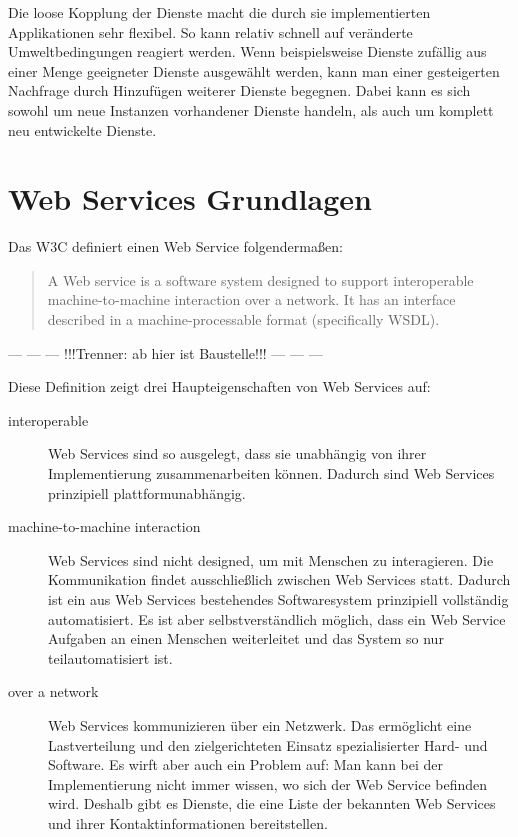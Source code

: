 \documentclass[runningheads]{llncs}
\newcommand{\germanquote}[1]{\glqq{}#1\grqq{}}
\begin{document}
    Die loose Kopplung der Dienste macht die durch sie implementierten Applikationen sehr flexibel. So kann relativ schnell auf veränderte Umweltbedingungen reagiert werden. Wenn beispielsweise Dienste zufällig aus einer Menge geeigneter Dienste ausgewählt werden, kann man einer gesteigerten Nachfrage durch Hinzufügen weiterer Dienste begegnen. Dabei kann es sich sowohl um neue Instanzen vorhandener Dienste handeln, als auch um komplett neu entwickelte Dienste.


  \label{ws}
  \section{Web Services Grundlagen}
  \nocite{wk_ws}
    Das W3C definiert einen \germanquote{Web Service} folgendermaßen:
    \begin{quote}
      A Web service is a software system designed to support interoperable machine-to-machine interaction over a network. It has an interface described in a machine-processable format (specifically WSDL).\cite{w3c_wsgloss_ws}
    \end{quote}

   \begin{center}--- --- --- !!!Trenner: ab hier ist Baustelle!!! --- --- ---\end{center}

    Diese Definition zeigt drei Haupteigenschaften von Web Services auf:
    \begin{description}
      \item[interoperable]
        Web Services sind so ausgelegt, dass sie unabhängig von ihrer Implementierung zusammenarbeiten können. Dadurch sind Web Services prinzipiell plattformunabhängig.
      \item[machine-to-machine interaction]
        Web Services sind nicht designed, um mit Menschen zu interagieren. Die Kommunikation findet ausschließlich zwischen Web Services statt. Dadurch ist ein aus Web Services bestehendes Softwaresystem prinzipiell vollständig automatisiert. Es ist aber selbstverständlich möglich, dass ein Web Service Aufgaben an einen Menschen weiterleitet und das System so nur teilautomatisiert ist.
      \item[over a network]
        Web Services kommunizieren über ein Netzwerk. Das ermöglicht eine Lastverteilung und den zielgerichteten Einsatz spezialisierter Hard- und Software. Es wirft aber auch ein Problem auf: Man kann bei der Implementierung nicht immer wissen, wo sich der Web Service befinden wird. Deshalb gibt es Dienste, die eine Liste der bekannten Web Services und ihrer Kontaktinformationen bereitstellen.
    \end{description}
\end{document}
